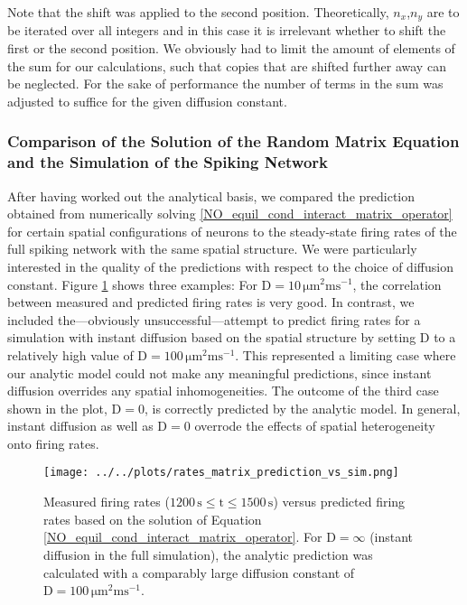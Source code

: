 \documentclass[10pt,a4paper]{article}
\begin{document}
Note that the shift was applied to the second position. Theoretically, $n_x$,$n_y$ are to be iterated over all integers and in this case it is irrelevant whether to shift the first or the second position. We obviously had to limit the amount of elements of the sum for our calculations, such that copies that are shifted further away can be neglected. For the sake of performance the number of terms in the sum was adjusted to suffice for the given diffusion constant.

\subsubsection{Comparison of the Solution of the Random Matrix Equation and the Simulation of the Spiking Network}\label{Section_Rand_Mat_vs_Sim}
After having worked out the analytical basis, we compared the prediction obtained from numerically solving \eqref{NO_equil_cond_interact_matrix_operator} for certain spatial configurations of neurons to the steady-state firing rates of the full spiking network with the same spatial structure. We were particularly interested in the quality of the predictions with respect to the choice of diffusion constant. Figure \ref{Rand_Matrix_Sol_vs_Sim} shows three examples: For $\mathrm{D=10\, \mu m^2 ms^{-1}}$, the correlation between measured and predicted firing rates is very good. In contrast, we included the---obviously unsuccessful---attempt to predict firing rates for a simulation with instant diffusion based on the spatial structure by setting D to a relatively high value of $\mathrm{D=100\, \mu m^2 ms^{-1}}$. This represented a limiting case where our analytic model could not make any meaningful predictions, since instant diffusion overrides any spatial inhomogeneities. The outcome of the third case shown in the plot, $\mathrm{D=0}$, is correctly predicted by the analytic model. In general, instant diffusion as well as $\mathrm{D=0}$ overrode the effects of spatial heterogeneity onto firing rates. 
\begin{figure}
\texttt{[image: ../../plots/rates\_matrix\_prediction\_vs\_sim.png]}
\caption{Measured firing rates ($\mathrm{1200\,s \leq t \leq 1500\, s}$) versus predicted firing rates based on the solution of Equation \eqref{NO_equil_cond_interact_matrix_operator}. For $\mathrm{D=\infty}$ (instant diffusion in the full simulation), the analytic prediction was calculated with a comparably large diffusion constant of $\mathrm{D=100\, \mu m^2 ms^{-1}}$.}
\label{Rand_Matrix_Sol_vs_Sim}
\end{figure}
\end{document}
